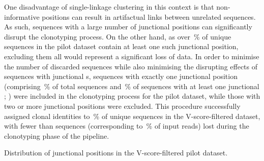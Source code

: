 One disadvantage of single-linkage clustering in this context is that non-informative  positions can result in artifactual links between unrelated sequences. As such, sequences with a large number of junctional  positions can significantly disrupt the clonotyping process. On the other hand, as over \,\% of unique sequences in the pilot dataset contain at least one such junctional  position, excluding them all would represent a significant loss of data. In order to minimise the number of discarded sequences while also minimising the disrupting effects of sequences with junctional s, sequences with exactly one junctional  position (comprising \,\% of total sequences and \,\% of sequences with at least one junctional ; ) were included in the clonotyping process for the pilot dataset, while those with two or more junctional  positions were excluded. This procedure successfully assigned clonal identities to \,\% of unique sequences in the V-score-filtered dataset, with fewer than  sequences (corresponding to \,\% of input reads) lost during the clonotyping phase of the pipeline.

\begin{table}
\caption{Distribution of junctional  positions in the V-score-filtered pilot dataset.}
\label{tab:igseq-pilot-filtered-nn}

\end{table}

